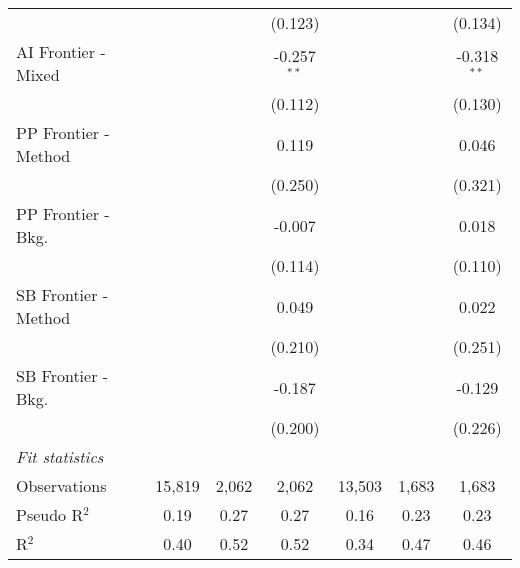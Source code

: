 \begin{tabular}{lcccccc}
                        &         &                & (0.123)       &              &              & (0.134)\\   
   AI Frontier - Mixed  &         &                & -0.257$^{**}$ &              &              & -0.318$^{**}$\\   
                        &         &                & (0.112)       &              &              & (0.130)\\   
   PP Frontier - Method &         &                & 0.119         &              &              & 0.046\\   
                        &         &                & (0.250)       &              &              & (0.321)\\   
   PP Frontier - Bkg.   &         &                & -0.007        &              &              & 0.018\\   
                        &         &                & (0.114)       &              &              & (0.110)\\   
   SB Frontier - Method &         &                & 0.049         &              &              & 0.022\\   
                        &         &                & (0.210)       &              &              & (0.251)\\   
   SB Frontier - Bkg.   &         &                & -0.187        &              &              & -0.129\\   
                        &         &                & (0.200)       &              &              & (0.226)\\   
   \midrule
   \emph{Fit statistics}\\
   Observations         & 15,819  & 2,062          & 2,062         & 13,503       & 1,683        & 1,683\\  
   Pseudo R$^2$         & 0.19    & 0.27           & 0.27          & 0.16         & 0.23         & 0.23\\  
   R$^2$                & 0.40    & 0.52           & 0.52          & 0.34         & 0.47         & 0.46\\  
   

\end{tabular}
